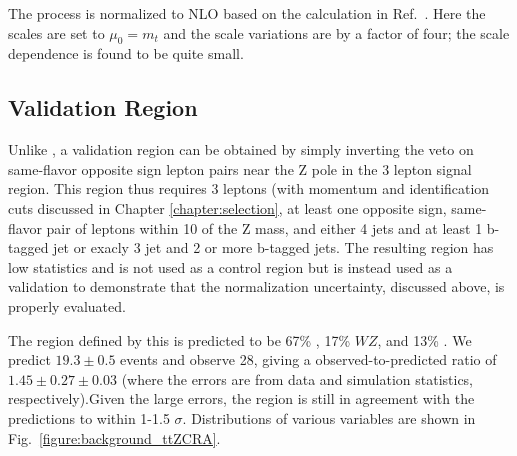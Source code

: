 The \tZ process is normalized to NLO based on the calculation in Ref.~\cite{Campbell:2013yla}.  Here the scales are set to $\mu_0 = m_t$ and the scale variations are by a factor of four; the scale dependence is found to be quite small.


\subsection{\ttZ Validation Region}

Unlike \ttW, a \ttZ validation region can be obtained by simply inverting the veto on same-flavor opposite sign lepton pairs near the Z pole in the 3 lepton signal region. This region thus requires 3 leptons (with momentum and identification cuts discussed in Chapter \ref{chapter:selection}, at least one opposite sign, same-flavor pair of leptons within 10 \gevcc of the Z mass, and either 4 jets and at least 1 b-tagged jet or exacly 3 jet and 2 or more b-tagged jets. The resulting region has low statistics and is not used as a control region but is instead used as a validation to demonstrate that the normalization uncertainty, discussed above, is properly evaluated. 

The region defined by this is predicted to be 67\% \ttZ, 17\% $WZ$, and 13\% \tZ.  We predict $19.3 \pm 0.5$ events and observe 28, giving a observed-to-predicted ratio of $1.45 \pm 0.27 \pm 0.03$ (where the errors are from data and simulation statistics, respectively).Given the large errors, the region is still in agreement with the predictions to within 1-1.5 $\sigma$.  Distributions of various variables are shown in Fig.~\ref{figure:background_ttZCRA}.  

